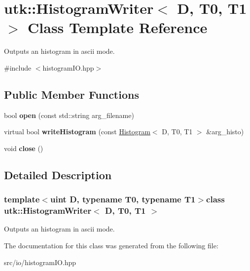 \hypertarget{classutk_1_1HistogramWriter}{\section{utk\-:\-:Histogram\-Writer$<$ D, T0, T1 $>$ Class Template Reference}
\label{classutk_1_1HistogramWriter}
}


Outputs an histogram in ascii mode.  




{\ttfamily \#include $<$histogram\-I\-O.\-hpp$>$}

\subsection*{Public Member Functions}
\begin{DoxyCompactItemize}
\item 
\hypertarget{classutk_1_1HistogramWriter_aa95d9a7349a6a873f980f1414fece8ee}{bool {\bfseries open} (const std\-::string arg\-\_\-filename)}\label{classutk_1_1HistogramWriter_aa95d9a7349a6a873f980f1414fece8ee}

\item 
\hypertarget{classutk_1_1HistogramWriter_ab13e62c1373e6eaa8c9382552a9119b1}{virtual bool {\bfseries write\-Histogram} (const \hyperlink{classutk_1_1Histogram}{Histogram}$<$ D, T0, T1 $>$ \&arg\-\_\-histo)}\label{classutk_1_1HistogramWriter_ab13e62c1373e6eaa8c9382552a9119b1}

\item 
\hypertarget{classutk_1_1HistogramWriter_af99a6ab66dd2eb92d97a26a1a857208c}{void {\bfseries close} ()}\label{classutk_1_1HistogramWriter_af99a6ab66dd2eb92d97a26a1a857208c}

\end{DoxyCompactItemize}


\subsection{Detailed Description}
\subsubsection*{template$<$uint D, typename T0, typename T1$>$class utk\-::\-Histogram\-Writer$<$ D, T0, T1 $>$}

Outputs an histogram in ascii mode. 

The documentation for this class was generated from the following file\-:\begin{DoxyCompactItemize}
\item 
src/io/histogram\-I\-O.\-hpp\end{DoxyCompactItemize}
